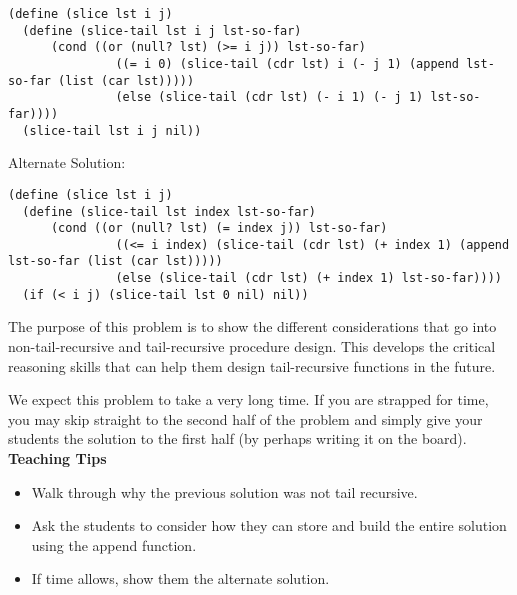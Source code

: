 \begin{parts}

\begin{blocksection}
\begin{solution}
\begin{lstlisting}
(define (slice lst i j)
  (define (slice-tail lst i j lst-so-far)
      (cond ((or (null? lst) (>= i j)) lst-so-far)
               ((= i 0) (slice-tail (cdr lst) i (- j 1) (append lst-so-far (list (car lst)))))
               (else (slice-tail (cdr lst) (- i 1) (- j 1) lst-so-far))))
  (slice-tail lst i j nil))
\end{lstlisting}
Alternate Solution:
\begin{lstlisting}
(define (slice lst i j)
  (define (slice-tail lst index lst-so-far)
      (cond ((or (null? lst) (= index j)) lst-so-far)
               ((<= i index) (slice-tail (cdr lst) (+ index 1) (append lst-so-far (list (car lst)))))
               (else (slice-tail (cdr lst) (+ index 1) lst-so-far))))
  (if (< i j) (slice-tail lst 0 nil) nil))
\end{lstlisting}
\end{solution}

\end{blocksection}
\end{parts}

\begin{blocksection}
\begin{guide}
The purpose of this problem is to show the different considerations that go into non-tail-recursive
and tail-recursive procedure design. This develops the critical reasoning skills that can help
them design tail-recursive functions in the future. 

We expect this problem to take a very long time. If you are strapped for time, you may skip straight to the second
half of the problem and simply give your students the solution to the first half (by perhaps writing it on the board). 
\textbf{Teaching Tips}
\begin{itemize}
	\item Walk through why the previous solution was not tail recursive.
	\item Ask the students to consider how they can store and build the entire solution using the append function.
	\item If time allows, show them the alternate solution.
\end{itemize}
\end{guide}
\end{blocksection}